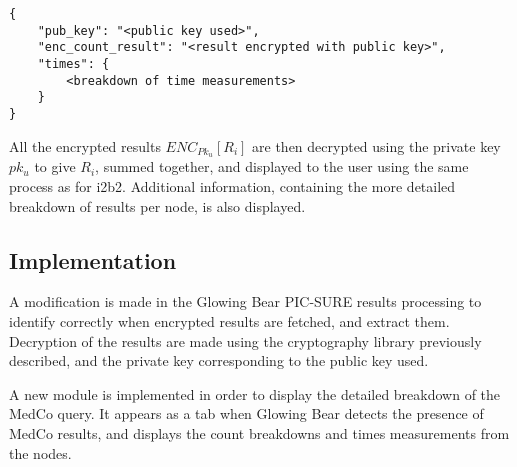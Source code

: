 \begin{verbatim}
{
    "pub_key": "<public key used>",
    "enc_count_result": "<result encrypted with public key>",
    "times": {
        <breakdown of time measurements>
    }
}    
\end{verbatim}

All the encrypted results $ENC_{Pk_u}[R_i]$ are then decrypted using the private key $pk_u$ to give $R_i$, summed together, and displayed to the user using the same process as for i2b2.
Additional information, containing the more detailed breakdown of results per node, is also displayed.


\subsection*{Implementation}

A modification is made in the Glowing Bear PIC-SURE results processing to identify correctly when encrypted results are fetched, and extract them.
Decryption of the results are made using the cryptography library previously described, and the private key corresponding to the public key used.

A new module is implemented in order to display the detailed breakdown of the MedCo query.
It appears as a tab when Glowing Bear detects the presence of MedCo results, and displays the count breakdowns and times measurements from the nodes.
